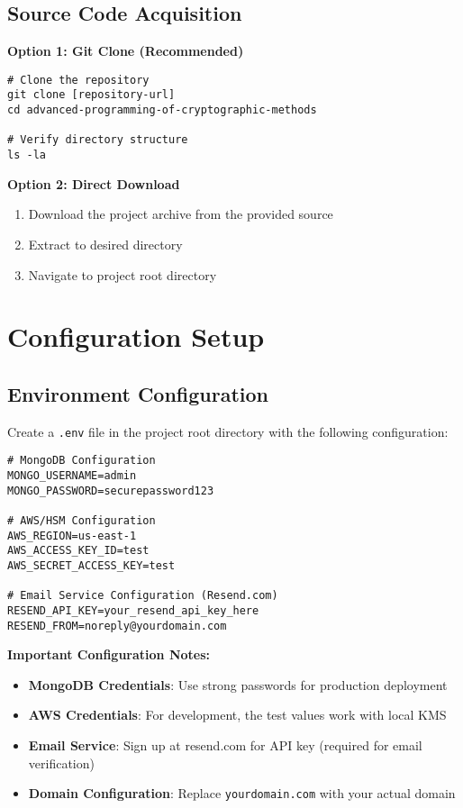 \subsection{Source Code Acquisition}

\textbf{Option 1: Git Clone (Recommended)}
\begin{verbatim}
# Clone the repository
git clone [repository-url]
cd advanced-programming-of-cryptographic-methods

# Verify directory structure
ls -la
\end{verbatim}

\textbf{Option 2: Direct Download}
\begin{enumerate}
    \item Download the project archive from the provided source
    \item Extract to desired directory
    \item Navigate to project root directory
\end{enumerate}

\section{Configuration Setup}

\subsection{Environment Configuration}

Create a \texttt{.env} file in the project root directory with the following configuration:

\begin{verbatim}
# MongoDB Configuration
MONGO_USERNAME=admin
MONGO_PASSWORD=securepassword123

# AWS/HSM Configuration
AWS_REGION=us-east-1
AWS_ACCESS_KEY_ID=test
AWS_SECRET_ACCESS_KEY=test

# Email Service Configuration (Resend.com)
RESEND_API_KEY=your_resend_api_key_here
RESEND_FROM=noreply@yourdomain.com
\end{verbatim}

\textbf{Important Configuration Notes:}
\begin{itemize}
    \item \textbf{MongoDB Credentials}: Use strong passwords for production deployment
    \item \textbf{AWS Credentials}: For development, the test values work with local KMS
    \item \textbf{Email Service}: Sign up at resend.com for API key (required for email verification)
    \item \textbf{Domain Configuration}: Replace \texttt{yourdomain.com} with your actual domain
\end{itemize}


